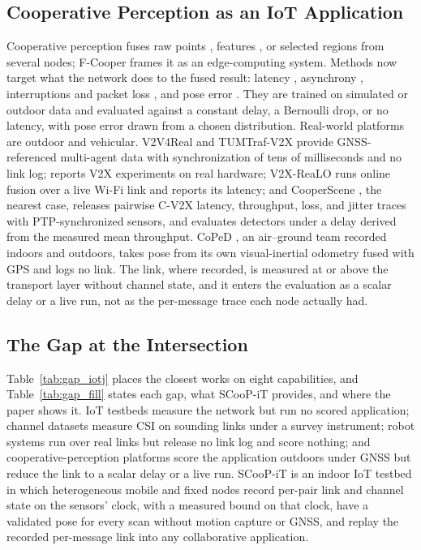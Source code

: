 \subsection{Cooperative Perception as an IoT Application}
Cooperative perception fuses raw points \cite{chen2019cooper},
features \cite{chen2019fcooper,wang2020v2vnet}, or selected regions
\cite{where2comm,liu2020when2com} from several nodes; F-Cooper
\cite{chen2019fcooper} frames it as an edge-computing system. Methods
now target what the network does to the fused result: latency
\cite{lei2022syncnet,v2xvit}, asynchrony \cite{wei2023cobevflow},
interruptions and packet loss \cite{ren2024v2xincop}, and pose error
\cite{lu2023coalign}. They are trained on simulated or outdoor data
\cite{opv2v,v2xsim,dairv2x} and evaluated against a constant delay, a
Bernoulli drop, or no latency, with pose error drawn from a chosen
distribution. Real-world platforms are outdoor and vehicular. V2V4Real
\cite{v2v4real} and TUMTraf-V2X \cite{zimmer2024tumtrafv2x} provide
GNSS-referenced multi-agent data with synchronization of tens of
milliseconds and no link log; \cite{hawlader2024v2xexp} reports V2X
experiments on real hardware; V2X-ReaLO \cite{v2xrealo} runs online
fusion over a live Wi-Fi link and reports its latency; and CooperScene
\cite{cooperscene}, the nearest case, releases pairwise C-V2X latency,
throughput, loss, and jitter traces with PTP-synchronized sensors, and
evaluates detectors under a delay derived from the measured mean
throughput. CoPeD \cite{coped}, an air--ground team recorded indoors
and outdoors, takes pose from its own visual-inertial odometry fused
with GPS and logs no link. The link, where recorded, is measured at or
above the transport layer without channel state, and it enters the
evaluation as a scalar delay or a live run, not as the per-message
trace each node actually had.

\subsection{The Gap at the Intersection}
Table~\ref{tab:gap_iotj} places the closest works on eight
capabilities, and Table~\ref{tab:gap_fill} states each gap, what
SCooP-iT provides, and where the paper shows it. IoT testbeds measure
the network but run no scored application; channel datasets measure
CSI on sounding links under a survey instrument; robot systems run
over real links but release no link log and score nothing; and
cooperative-perception platforms score the application outdoors under
GNSS but reduce the link to a scalar delay or a live run. SCooP-iT is
an indoor IoT testbed in which heterogeneous mobile and fixed nodes
record per-pair link and channel state on the sensors' clock, with a
measured bound on that clock, have a validated pose for every scan
without motion capture or GNSS, and replay the recorded per-message
link into any collaborative application.



